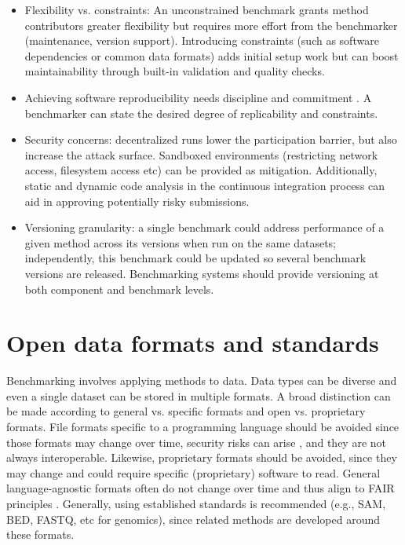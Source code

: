 \documentclass[11pt]{article}
\begin{document}
\begin{itemize}
    \item Flexibility vs. constraints:  An unconstrained benchmark grants method contributors greater flexibility but requires more effort from the benchmarker (maintenance, version support). Introducing constraints (such as software dependencies or common data formats) adds initial setup work but can boost maintainability through built-in validation and quality checks.
    \item  Achieving software reproducibility needs discipline and commitment \cite{Lamb2021-tb}. A benchmarker can state the desired degree of replicability and constraints. 
    \item  Security concerns: decentralized runs lower the participation barrier, but also increase the attack  surface. Sandboxed environments (restricting network access, filesystem access etc) can be provided as mitigation. Additionally, static and dynamic code analysis in the continuous integration process can aid in approving potentially risky submissions.
    \item {\color{red} Versioning granularity: a single benchmark could address performance of a given method across its versions when run on the same datasets; independently, this benchmark could be updated so several benchmark versions are released. Benchmarking systems should provide versioning at both component and benchmark levels.}
\end{itemize}


\section*{Open data formats and standards}

Benchmarking involves applying methods to data. Data types can be diverse and even a single dataset can be stored in multiple formats. A broad distinction can be made according to general vs. specific formats and open vs. proprietary formats. File formats specific to a programming language should be avoided since those formats may change over time, security risks can arise \cite{Huynh2023-pq, Bleih2024-lv}, and they are not always interoperable. Likewise, proprietary formats should be avoided, since they may change and could require specific (proprietary) software to read. General language-agnostic formats often do not change over time and thus align to FAIR principles \cite{Wilkinson2016-bh}. Generally, using established standards is recommended (e.g., SAM, BED, FASTQ, etc for genomics), since related methods are developed around these formats.
\end{document}
